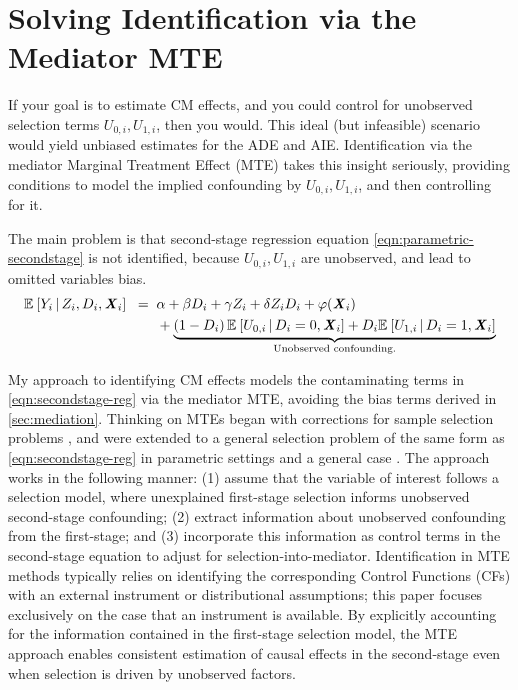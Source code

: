 \section{Solving Identification via the Mediator MTE}
\label{sec:selectionmodel}
If your goal is to estimate CM effects, and you could control for unobserved selection terms $U_{0,i}, U_{1,i}$, then you would.
This ideal (but infeasible) scenario would yield unbiased estimates for the ADE and AIE.
Identification via the mediator Marginal Treatment Effect (MTE) takes this insight seriously, providing conditions to model the implied confounding by $U_{0,i}, U_{1,i}$, and then controlling for it.

The main problem is that second-stage regression equation \eqref{eqn:parametric-secondstage} is not identified, because $U_{0,i},U_{1,i}$ are unobserved, and lead to omitted variables bias.
\begin{align}
    \mathbb{E}_{} \left[ Y_i \, \middle\vert \, Z_i, D_i, \boldsymbol{\mathit{X}}_i \right] \;\; =& \;\;
        \alpha
        + \beta D_i
        + \gamma Z_i
        + \delta Z_i D_i
        + \varphi(\boldsymbol{\mathit{X}}_i) \nonumber \\
        \label{eqn:secondstage-reg}
        & \;\; +\underbrace{\left( 1 - D_i
            \right) \mathbb{E}_{} \left[  U_{0,i}  \, \middle\vert \, D_i = 0, \boldsymbol{\mathit{X}}_i \right]
                + D_i \mathbb{E}_{} \left[  U_{1,i}  \, \middle\vert \, D_i = 1, \boldsymbol{\mathit{X}}_i \right]}_{
                    \text{Unobserved confounding.}}
\end{align}

My approach to identifying CM effects models the contaminating terms in \eqref{eqn:secondstage-reg} via the mediator MTE, avoiding the bias terms derived in \autoref{sec:mediation}.
Thinking on MTEs began with corrections for sample selection problems \citep{heckman1974shadow}, and were extended to a general selection problem of the same form as \autoref{eqn:secondstage-reg} in parametric settings \citep{heckman1979sample,bjorklund1987estimation} and a general case \citep{heckman2005structural}.
The approach works in the following manner: (1) assume that the variable of interest follows a selection model, where unexplained first-stage selection informs unobserved second-stage confounding; (2) extract information about unobserved confounding from the first-stage; and (3) incorporate this information as control terms in the second-stage equation to adjust for selection-into-mediator.
Identification in MTE methods typically relies on identifying the corresponding Control Functions (CFs) with an external instrument or distributional assumptions; this paper focuses exclusively on the case that an instrument is available.
By explicitly accounting for the information contained in the first-stage selection model, the MTE approach enables consistent estimation of causal effects in the second-stage even when selection is driven by unobserved factors.

